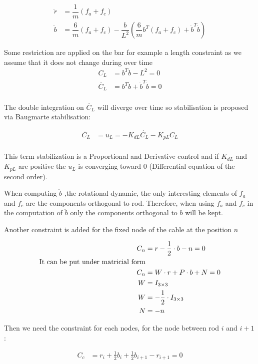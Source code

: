 \documentclass[twoside,12pt]{report} %
\begin{document}
\begin{align}
\ddot{r} &= \dfrac{1}{m}  (f_a+f_c) \nonumber\\
\ddot{b} &=  \dfrac{6}{m}(f_a+f_c) - \dfrac{b}{L^{2}}  (\dfrac{6}{m}b^{T}(f_a+f_c)+\dot{b}^{T}\dot{b}) 
\end{align}

Some restriction are applied on the bar for example a length constraint as we assume that it does not change during over time
\begin{align}
C_L &= b^T b-L^2=0 \\
\ddot{C_L} &= b^T \ddot{b}+\dot{b}^T \dot{b}=0 \\
\end{align}

The double integration on $\ddot{C_L}$ will diverge over time so stabilisation is proposed via Baugmarte stabilisation:

\begin{align}
\ddot{C_L} &= u_L = -K_{dL} \dot{C_L} - K_{pL} C_L \\
\end{align}

This term stabilization is a Proportional and Derivative control and if $K_{dL}$ and $K_{pL}$ are positive the $u_L$ is converging toward 0 (Differential equation of the second order).

When computing $\ddot{b}$ ,the rotational dynamic, the only interesting elements of $f_a$ and $f_c$ are the components orthogonal to rod. Therefore, when using  $f_a$ and $f_c$ in the computation of $\ddot{b}$  only the components orthogonal to $b$ will be kept.

Another constraint is added for the fixed node of the cable at the position $n$

\begin{align}
C_n &= r -\frac{1}{2} \cdot b - n = 0 \nonumber \\
\textnormal{It can be put under matricial form} \nonumber \\
C_n &= W \cdot r + P\cdot b + N = 0 \nonumber  \\
W &= I_{3\times3} \nonumber \\
W &= -\frac{1}{2} \cdot I_{3\times3} \nonumber \\
N &= -n \\
\end{align}

Then we need the constraint for each nodes, for the node between rod $i$ and $i+1$:

\begin{align}
C_c &=  r_i+ \frac{1}{2}  b_i +\frac{1}{2}  b_{i+1} - r_{i+1} =0 \\
\end{align}
\end{document}
